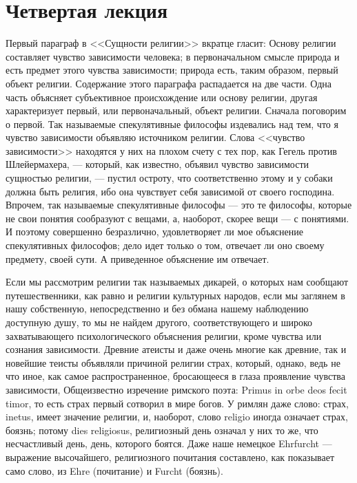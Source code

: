 \documentclass[12pt]{article}
\begin{document}
{}
\section*{Четвертая лекция}

Первый параграф в <<Сущности религии>> вкратце гласит: Основу религии составляет чувство зависимости человека; в первоначальном смысле природа и есть предмет этого чувства зависимости; природа есть, таким образом, первый объект религии. Содержание этого параграфа распадается на две части. Одна часть объясняет субъективное происхождение или основу религии, другая характеризует первый, или первоначальный, объект религии. Сначала поговорим о первой. Так называемые спекулятивные философы издевались над тем, что я чувство зависимости объявляю источником религии. Слова <<чувство зависимости>> находятся у них на плохом счету с тех пор, как Гегель против Шлейермахера, --- который, как известно, объявил чувство зависимости сущностью религии, --- пустил остроту, что соответственно этому и у собаки должна быть религия, ибо она чувствует себя зависимой от своего господина. Впрочем, так называемые спекулятивные философы --- это те философы, которые не свои понятия сообразуют с вещами, а, наоборот, скорее вещи --- с понятиями. И поэтому совершенно безразлично, удовлетворяет ли мое объяснение спекулятивных философов; дело идет только о том, отвечает ли оно своему предмету, своей сути. А приведенное объяснение им отвечает. 

Если мы рассмотрим религии так называемых дикарей, о которых нам сообщают путешественники, как равно и религии культурных народов, если мы заглянем в нашу собственную, непосредственно и без обмана нашему наблюдению доступную душу, то мы не найдем другого, соответствующего и широко захватывающего психологического объяснения религии, кроме чувства или сознания зависимости. Древние атеисты и даже очень многие как древние, так и новейшие теисты объявляли причиной религии страх, который, однако, ведь не что иное, как самое распространенное, бросающееся в глаза проявление чувства зависимости, Общеизвестно изречение римского поэта: Primus in orbe deos fecit timor, то есть страх первый сотворил в мире богов. У римлян даже слово: страх, inetus, имеет значение религии, и, наоборот, слово religio иногда означает страх, боязнь; потому dies religiosus, религиозный день означал у них то же, что несчастливый день, день, которого боятся. Даже наше немецкое Ehrfurcht --- выражение высочайшего, религиозного почитания составлено, как показывает само слово, из Ehre (почитание) и Furcht (боязнь). 
\end{document}
